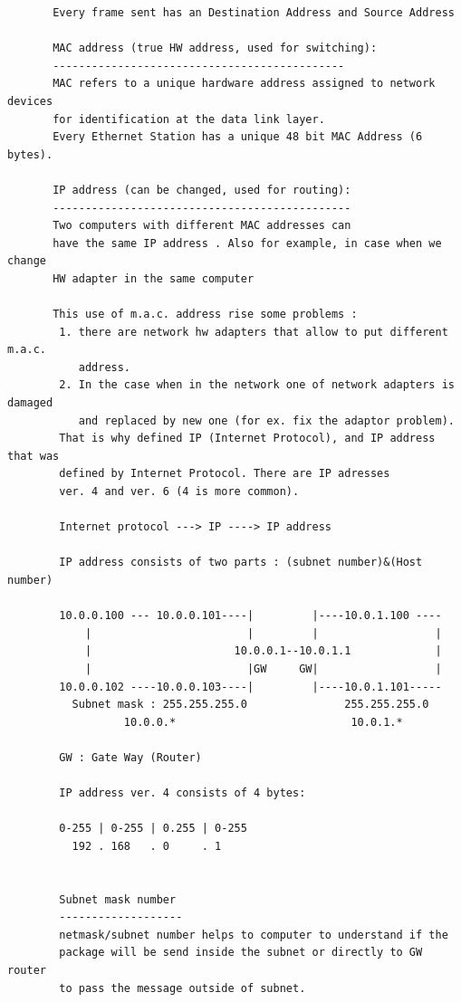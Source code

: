 \documentclass[a4paper,12pt]{article}
\begin{document}
\begin{verbatim}
       Every frame sent has an Destination Address and Source Address
       
       MAC address (true HW address, used for switching):
       ---------------------------------------------       
       MAC refers to a unique hardware address assigned to network devices  
       for identification at the data link layer.
       Every Ethernet Station has a unique 48 bit MAC Address (6 bytes).
       
       IP address (can be changed, used for routing):
       ----------------------------------------------
       Two computers with different MAC addresses can
       have the same IP address . Also for example, in case when we change
       HW adapter in the same computer 
       
       This use of m.a.c. address rise some problems : 
        1. there are network hw adapters that allow to put different m.a.c. 
           address.
        2. In the case when in the network one of network adapters is damaged 
           and replaced by new one (for ex. fix the adaptor problem). 
        That is why defined IP (Internet Protocol), and IP address that was 
        defined by Internet Protocol. There are IP adresses 
        ver. 4 and ver. 6 (4 is more common).
        
        Internet protocol ---> IP ----> IP address  
        
        IP address consists of two parts : (subnet number)&(Host number)       
        
        10.0.0.100 --- 10.0.0.101----|         |----10.0.1.100 ---- 
            |                        |         |                  |
            |                      10.0.0.1--10.0.1.1             |
            |                        |GW     GW|                  |
        10.0.0.102 ----10.0.0.103----|         |----10.0.1.101-----  
          Subnet mask : 255.255.255.0               255.255.255.0              
                  10.0.0.*                           10.0.1.*
         
        GW : Gate Way (Router)        
        
        IP address ver. 4 consists of 4 bytes:
        
        0-255 | 0-255 | 0.255 | 0-255
          192 . 168   . 0     . 1
        
             
        Subnet mask number 
        ------------------- 
        netmask/subnet number helps to computer to understand if the 
        package will be send inside the subnet or directly to GW router
        to pass the message outside of subnet.         


\end{verbatim}
\end{document}
